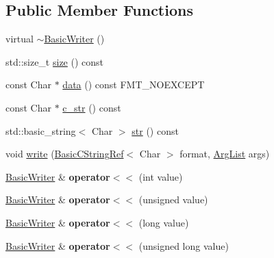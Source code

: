\subsection*{Public Member Functions}
\begin{DoxyCompactItemize}
\item 
virtual \hyperlink{classfmt_1_1BasicWriter_a25f6fc2e43d3bcfb3de9ac33afe6050d}{$\sim$\+Basic\+Writer} ()
\item 
std\+::size\+\_\+t \hyperlink{classfmt_1_1BasicWriter_a1b6721b4ba4d3fa18ac781a36616cc2a}{size} () const 
\item 
const Char $\ast$ \hyperlink{classfmt_1_1BasicWriter_a62d1c7b5be9c3580326320d5d178d096}{data} () const F\+M\+T\+\_\+\+N\+O\+E\+X\+C\+E\+PT
\item 
const Char $\ast$ \hyperlink{classfmt_1_1BasicWriter_a8b68001f5c1c0ea851ddaef27dcbc691}{c\+\_\+str} () const 
\item 
std\+::basic\+\_\+string$<$ Char $>$ \hyperlink{classfmt_1_1BasicWriter_a91f06ced6e063ee77a99740e0e79faf6}{str} () const 
\item 
void \hyperlink{classfmt_1_1BasicWriter_aaa83498c649d4a90ea3366bae62f4eac}{write} (\hyperlink{classfmt_1_1BasicCStringRef}{Basic\+C\+String\+Ref}$<$ Char $>$ format, \hyperlink{classfmt_1_1ArgList}{Arg\+List} args)
\item 
\hyperlink{classfmt_1_1BasicWriter}{Basic\+Writer} \& {\bfseries operator$<$$<$} (int value)\hypertarget{classfmt_1_1BasicWriter_a3d21148f336a76a71b39abb2fd6c0f88}{}\label{classfmt_1_1BasicWriter_a3d21148f336a76a71b39abb2fd6c0f88}

\item 
\hyperlink{classfmt_1_1BasicWriter}{Basic\+Writer} \& {\bfseries operator$<$$<$} (unsigned value)\hypertarget{classfmt_1_1BasicWriter_a7ec4d6fb4cf9173b14d4ee100fd4a428}{}\label{classfmt_1_1BasicWriter_a7ec4d6fb4cf9173b14d4ee100fd4a428}

\item 
\hyperlink{classfmt_1_1BasicWriter}{Basic\+Writer} \& {\bfseries operator$<$$<$} (long value)\hypertarget{classfmt_1_1BasicWriter_a1fd4183e01fd56ec99af40431b32561b}{}\label{classfmt_1_1BasicWriter_a1fd4183e01fd56ec99af40431b32561b}

\item 
\hyperlink{classfmt_1_1BasicWriter}{Basic\+Writer} \& {\bfseries operator$<$$<$} (unsigned long value)\hypertarget{classfmt_1_1BasicWriter_a4e0ef5415eb162ec991b69b930245094}{}\label{classfmt_1_1BasicWriter_a4e0ef5415eb162ec991b69b930245094}


\end{DoxyCompactItemize}
